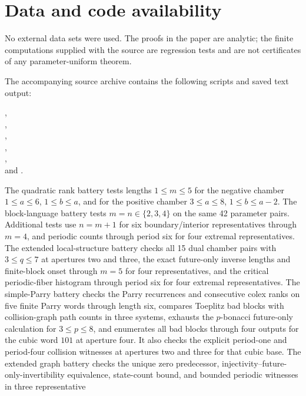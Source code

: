 \section*{Data and code availability}

No external data sets were used.  The proofs in the paper are analytic; the
finite computations supplied with the source are regression tests and are not
certificates of any parameter-uniform theorem.

The accompanying source archive contains the following scripts and saved
text output:
\begin{flushleft}
,\\
,\\
,\\
,\\
,\\
and .
\end{flushleft}
The quadratic rank battery tests lengths
$1\le m\le5$ for the negative chamber
$1\le a\le6$, $1\le b\le a$, and for the positive chamber
$3\le a\le8$, $1\le b\le a-2$.  The block-language battery tests
$m=n\in\{2,3,4\}$ on the same 42 parameter pairs.  Additional tests use
$n=m+1$ for six boundary/interior representatives through $m=4$, and periodic
counts through period six for four extremal representatives.
The extended local-structure battery checks all 15 dual chamber pairs with
$3\le q\le7$ at apertures two and three, the exact future-only inverse lengths and
finite-block onset through $m=5$ for four representatives, and the critical
periodic-fiber histogram through period six for four extremal representatives.
The simple-Parry battery checks the Parry recurrences and consecutive colex
ranks on five finite Parry words through length six, compares Toeplitz bad
blocks with collision-graph path counts in three systems, exhausts the
$p$-bonacci future-only calculation for $3\le p\le8$, and enumerates all bad
blocks through four outputs for the cubic word $101$ at aperture four.  It
also checks the explicit period-one and period-four collision witnesses at
apertures two and three for that cubic base.  The extended graph battery
checks the unique zero predecessor, injectivity--future-only-invertibility equivalence,
state-count bound, and bounded periodic witnesses in three representative
